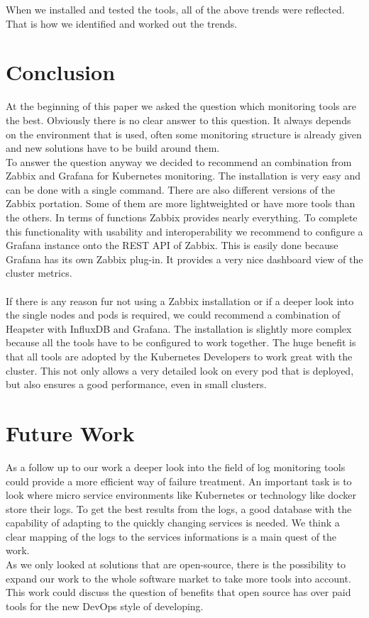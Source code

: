 When we installed and tested the tools, all of the above trends were reflected. That is how we identified and worked out the trends. 


\section{Conclusion}
At the beginning of this paper we asked the question which monitoring tools are the best. Obviously there is no clear answer to this question. It always depends on the environment that is used, often some monitoring structure is already given and new solutions have to be build around them.\\
To answer the question anyway we decided to recommend an combination from Zabbix and Grafana for Kubernetes monitoring. The installation is very easy and can be done with a single command. There are also different versions of the Zabbix portation. Some of them are more lightweighted or have more tools than the others. In terms of functions Zabbix provides nearly everything. To complete this functionality with usability and interoperability we recommend to configure a Grafana instance onto the REST API of Zabbix. This is easily done because Grafana has its own Zabbix plug-in. It provides a very nice dashboard view of the cluster metrics.\\
\\
If there is any reason fur not using a Zabbix installation or if a deeper look into the single nodes and pods is required, we could recommend a combination of Heapster with InfluxDB and Grafana. The installation is slightly more complex because all the tools have to be configured to work together. The huge benefit is that all tools are adopted by the Kubernetes Developers to work great with the cluster. This not only allows a very detailed look on every pod that is deployed, but also ensures a good performance, even in small clusters. 

\section{Future Work}
As a follow up to our work a deeper look into the field of log monitoring tools could provide a more efficient way of failure treatment. An important task is to look where micro service environments like Kubernetes or technology like docker store their logs. To get the best results from the logs, a good database with the capability of adapting to the quickly changing services is needed. We think a clear mapping of the logs to the services informations is a main quest of the work.\\
As we only looked at solutions that are open-source, there is the possibility to expand our work to the whole software market to take more tools into account. This work could discuss the question of benefits that open source has over paid tools for the new DevOps style of developing.

